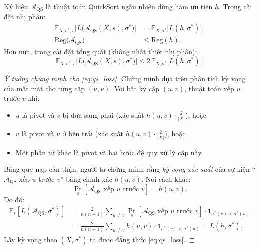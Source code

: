 \begin{theorem}
\label{thm:quicksort_pref}
Ký hiệu $\mathcal{A}_{\mathrm{QS}}$ là thuật toán QuickSort ngẫu nhiên dùng hàm ưu tiên $h$. Trong cài đặt nhị phân:
\begin{align}
    \mathbb{E}_{X, \sigma^*, s}\bigl[L\bigl(\mathcal{A}_{\mathrm{QS}}(X, s), \sigma^*\bigr)\bigr] &= \mathbb{E}_{X, \sigma^*}\bigl[L(h, \sigma^*)\bigr], \label{eq:qs_loss} \\
    \mathrm{Reg}\bigl(\mathcal{A}_{\mathrm{QS}}\bigr) &\leq \mathrm{Reg}(h). \label{eq:qs_regret}
\end{align}
Hơn nữa, trong cài đặt tổng quát (không nhất thiết nhị phân):
\begin{equation}
    \mathbb{E}_{X, \sigma^*, s}\bigl[L\bigl(\mathcal{A}_{\mathrm{QS}}(X, s), \sigma^*\bigr)\bigr] \leq 2\, \mathbb{E}_{X, \sigma^*}\bigl[L(h, \sigma^*)\bigr]. \label{eq:qs_general}
\end{equation}
\end{theorem}

\begin{proof}[Ý tưởng chứng minh cho \eqref{eq:qs_loss}]
Chứng minh dựa trên phân tích kỳ vọng của mất mát cho từng cặp $(u,v)$. Với bất kỳ cặp $(u,v)$, thuật toán xếp $u$ trước $v$ khi:
\begin{itemize}
    \item $u$ là pivot và $v$ bị đưa sang phải (xác suất $h(u,v) \cdot \frac{2}{|X|}$), hoặc
    \item $v$ là pivot và $u$ ở bên trái (xác suất $h(u,v) \cdot \frac{2}{|X|}$), hoặc
    \item Một phần tử khác là pivot và hai bước đệ quy xử lý cặp này.
\end{itemize}

Bằng quy nạp cẩn thận, người ta chứng minh rằng \emph{kỳ vọng xác suất} của sự kiện ``$\mathcal{A}_{\mathrm{QS}}$ xếp $u$ trước $v$'' bằng chính xác $h(u,v)$. Nói cách khác:
\[
    \Pr_s[\mathcal{A}_{\mathrm{QS}} \text{ xếp } u \text{ trước } v] = h(u, v).
\]
Do đó:
\begin{align*}
    \mathbb{E}_s[L(\mathcal{A}_{\mathrm{QS}}, \sigma^*)] &= \frac{2}{n(n-1)} \sum_{u \neq v} \Pr_s[\mathcal{A}_{\mathrm{QS}} \text{ xếp } u \text{ trước } v] \cdot \mathbf{1}_{\sigma^*(v) < \sigma^*(u)} \\
    &= \frac{2}{n(n-1)} \sum_{u \neq v} h(u,v) \cdot \mathbf{1}_{\sigma^*(v) < \sigma^*(u)} = L(h, \sigma^*).
\end{align*}
Lấy kỳ vọng theo $(X, \sigma^*)$ ta được đẳng thức \eqref{eq:qs_loss}.
\end{proof}

